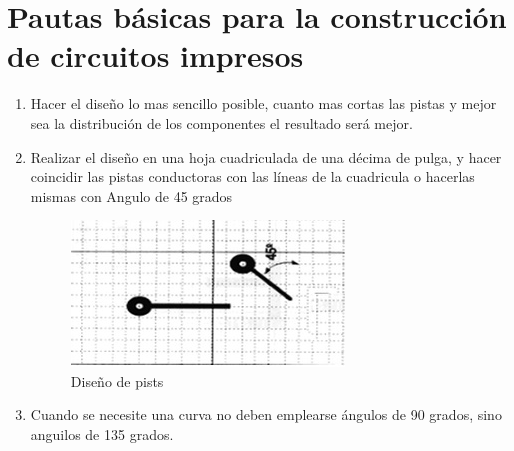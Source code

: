 \documentclass[a4paper,12pt,twoside]{proyectotanquesecci}
\begin{document}
\section{Pautas básicas para la construcción de circuitos impresos}

\begin{enumerate}
\item Hacer el diseño  lo mas sencillo posible, cuanto mas cortas las pistas y mejor sea la distribución de los componentes el resultado será mejor.
\item Realizar el diseño  en una hoja cuadriculada de una décima de pulga, y hacer coincidir las pistas conductoras con las líneas de la cuadricula o hacerlas mismas con Angulo de 45 grados
\begin{figure}[h]
\centering
\includegraphics[scale=0.8]{pauta1.jpg}
\renewcommand{\figurename}{Fig.}
\caption{Diseño de pists}
\label{Diseño de pistas}
\end{figure}

\item Cuando se necesite una curva no deben emplearse ángulos de  90 grados, sino anguilos de 135 grados.


\end{enumerate}
\end{document}
